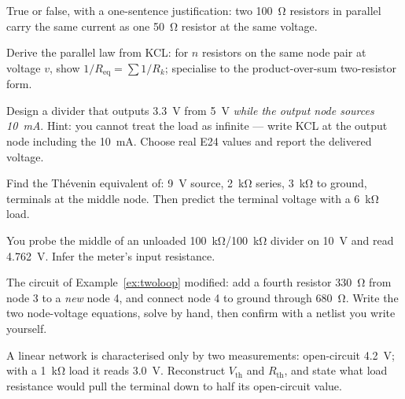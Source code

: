 \begin{exercise}[easy]
True or false, with a one-sentence justification: two \qty{100}{\ohm}
resistors in parallel carry the same current as one \qty{50}{\ohm} resistor
at the same voltage.
\end{exercise}

\begin{exercise}
Derive the parallel law from KCL: for $n$ resistors on the same node pair at
voltage $v$, show $1/R_{\mathrm{eq}} = \sum 1/R_k$; specialise to the
product-over-sum two-resistor form.
\end{exercise}

\begin{exercise}
Design a divider that outputs \qty{3.3}{\volt} from \qty{5}{\volt}
\emph{while the output node sources \qty{10}{\milli\ampere}}. Hint: you
cannot treat the load as infinite — write KCL at the output node including
the \qty{10}{\milli\ampere}. Choose real E24 values and report the delivered
voltage.
\end{exercise}

\begin{exercise}[medium]
Find the Th\'evenin equivalent of: \qty{9}{\volt} source, \qty{2}{\kilo\ohm}
series, \qty{3}{\kilo\ohm} to ground, terminals at the middle node. Then
predict the terminal voltage with a \qty{6}{\kilo\ohm} load.
\end{exercise}

\begin{exercise}[medium]
You probe the middle of an unloaded \qty{100}{\kilo\ohm}/\qty{100}{\kilo\ohm}
divider on \qty{10}{\volt} and read \qty{4.762}{\volt}. Infer the meter's
input resistance.
\end{exercise}

\begin{exercise}
The circuit of Example~\ref{ex:twoloop} modified: add a fourth resistor
\qty{330}{\ohm} from node 3 to a \emph{new} node 4, and connect node 4 to
ground through \qty{680}{\ohm}. Write the two node-voltage equations, solve
by hand, then confirm with a netlist you write yourself.
\end{exercise}

\begin{exercise}[hard]
A linear network is characterised only by two measurements: open-circuit
\qty{4.2}{\volt}; with a \qty{1}{\kilo\ohm} load it reads \qty{3.0}{\volt}.
Reconstruct $V_{\mathrm{th}}$ and $R_{\mathrm{th}}$, and state what load
resistance would pull the terminal down to half its open-circuit value.
\end{exercise}

